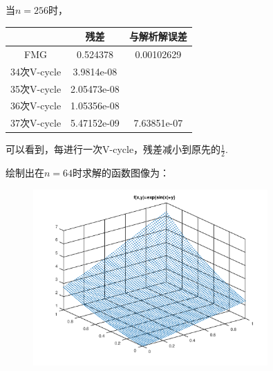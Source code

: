 \documentclass[a4paper,11.5pt,UTF8]{ctexart}
\begin{document}
\begin{large}
\begin{center}
\end{center}
当$n=256$时，
\begin{center}
	\begin{tabular}{|c|c|c|}
		\hline
		& 残差 & 与解析解误差  \\
		\hline
		FMG & 0.524378 & 0.00102629  \\
		\hline
		34次V-cycle & 3.9814e-08 & ~  \\
		\hline
		35次V-cycle & 2.05473e-08 & ~  \\
		\hline
		36次V-cycle & 1.05356e-08 & ~  \\
		\hline
		37次V-cycle & 5.47152e-09 & 7.63851e-07  \\
		\hline
	\end{tabular}
\end{center}
可以看到，每进行一次V-cycle，残差减小到原先的$\frac{1}{2}$.
\par 绘制出在$n=64$时求解的函数图像为：
\begin{figure}[H]
	\centering
	\includegraphics[width=0.8\textwidth,height=0.6\textwidth]{../output/figure/dim2_1.png}
\end{figure}


\end{large}
\end{document}
